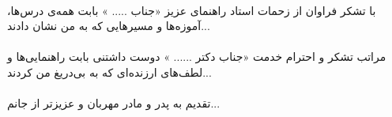 
\thispagestyle{empty}


\paragraph*{}
با تشکر فراوان از زحمات استاد راهنمای عزیز «جناب ..... » بابت همه‌ی درس‌ها، آموزه‌ها و مسیرهایی که به من نشان دادند...

\paragraph*{}
مراتب تشکر و احترام خدمت «جناب دکتر ...... » دوست داشتنی بابت راهنمایی‌ها و لطف‌های ارزنده‌ای که به بی‌دریغ من کردند...

\paragraph*{}
تقدیم به پدر و مادر مهربان و عزیزتر از جانم...